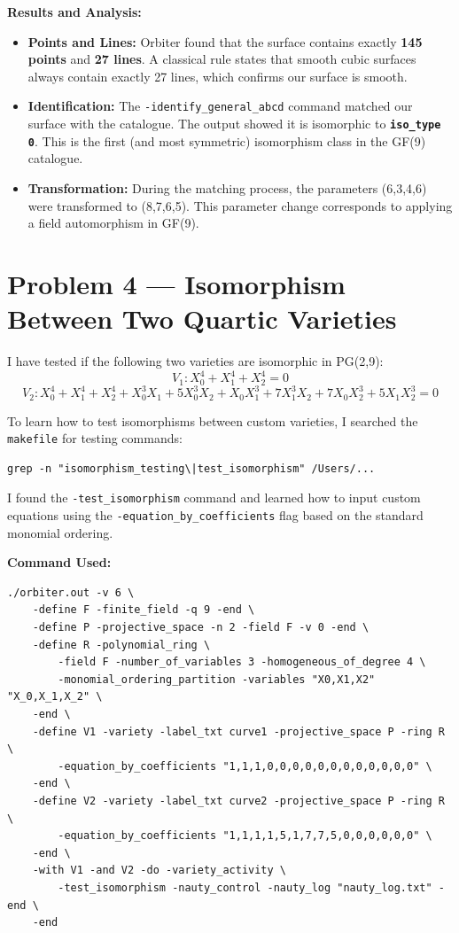 \documentclass[12pt,a4paper]{article}
\begin{document}
\textbf{Results and Analysis:}
\begin{itemize}
    \item \textbf{Points and Lines:} Orbiter found that the surface contains exactly \textbf{145 points} and \textbf{27 lines}. A classical rule states that smooth cubic surfaces always contain exactly 27 lines, which confirms our surface is smooth.
    \item \textbf{Identification:} The \texttt{-identify\_general\_abcd} command matched our surface with the catalogue. The output showed it is isomorphic to \textbf{\texttt{iso\_type 0}}. This is the first (and most symmetric) isomorphism class in the GF(9) catalogue.
    \item \textbf{Transformation:} During the matching process, the parameters (6,3,4,6) were transformed to (8,7,6,5). This parameter change corresponds to applying a field automorphism in GF(9).
\end{itemize}

\newpage

\section*{Problem 4 --- Isomorphism Between Two Quartic Varieties}

I have tested if the following two varieties are isomorphic in PG(2,9):
\[ V_1: X_0^4 + X_1^4 + X_2^4 = 0 \]
\[ V_2: X_0^4 + X_1^4 + X_2^4 + X_0^3X_1 + 5X_0^3X_2 + X_0X_1^3 + 7X_1^3X_2 + 7X_0X_2^3 + 5X_1X_2^3 = 0 \]

To learn how to test isomorphisms between custom varieties, I searched the \texttt{makefile} for testing commands:
\begin{verbatim}
grep -n "isomorphism_testing\|test_isomorphism" /Users/...
\end{verbatim}
I found the \texttt{-test\_isomorphism} command and learned how to input custom equations using the \texttt{-equation\_by\_coefficients} flag based on the standard monomial ordering.

\vspace{0.3cm}\noindent\textbf{Command Used:}
\begin{verbatim}
./orbiter.out -v 6 \
    -define F -finite_field -q 9 -end \
    -define P -projective_space -n 2 -field F -v 0 -end \
    -define R -polynomial_ring \
        -field F -number_of_variables 3 -homogeneous_of_degree 4 \
        -monomial_ordering_partition -variables "X0,X1,X2" "X_0,X_1,X_2" \
    -end \
    -define V1 -variety -label_txt curve1 -projective_space P -ring R \
        -equation_by_coefficients "1,1,1,0,0,0,0,0,0,0,0,0,0,0,0" \
    -end \
    -define V2 -variety -label_txt curve2 -projective_space P -ring R \
        -equation_by_coefficients "1,1,1,1,5,1,7,7,5,0,0,0,0,0,0" \
    -end \
    -with V1 -and V2 -do -variety_activity \
        -test_isomorphism -nauty_control -nauty_log "nauty_log.txt" -end \
    -end
\end{verbatim}
\end{document}
